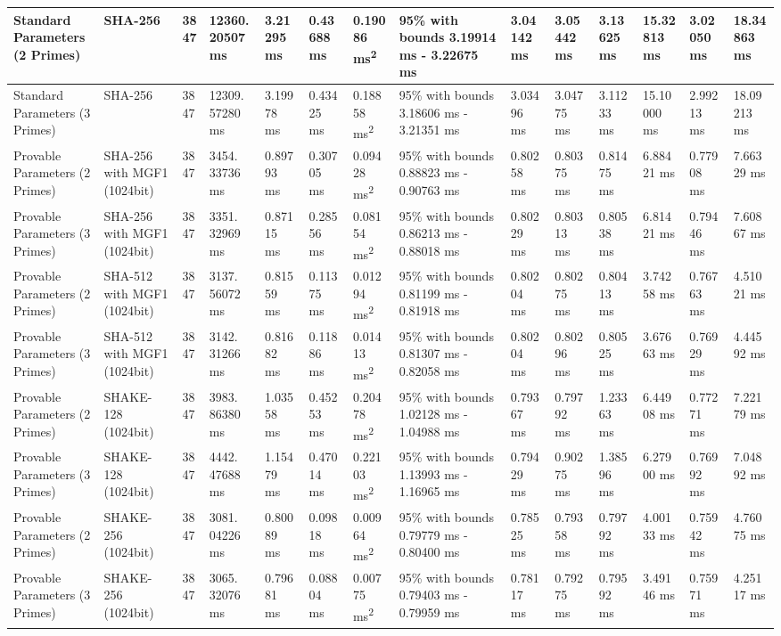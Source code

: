 \documentclass[]{final_report}
\theoremstyle{definition}
\begin{document}
\begin{landscape}
\begin{longtable}{|p{2.3cm}|p{1.8cm}|p{1.0cm}|p{1.7cm}|p{1.4cm}|p{1.5cm}|p{1.8cm}|p{1.5cm}|p{1.43cm}|p{1.5cm}|p{1.3cm}|p{1.4cm}|p{1.3cm}|p{1.3cm}|}
\hline
\endlastfoot
Standard Parameters (2 Primes) & SHA-256 & 3847 & 12360.
20507 ms & 3.21295 ms & 0.43688 ms & 0.19086 ms\textsuperscript{2} & 95\% with bounds 3.19914 ms - 3.22675 ms & 3.04142 ms & 3.05442 ms & 3.13625 ms & 15.32813 ms & 3.02050 ms & 18.34863 ms \\
\hline
Standard Parameters (3 Primes) & SHA-256 & 3847 & 12309.
57280 ms & 3.19978 ms & 0.43425 ms & 0.18858 ms\textsuperscript{2} & 95\% with bounds 3.18606 ms - 3.21351 ms & 3.03496 ms & 3.04775 ms & 3.11233 ms & 15.10000 ms & 2.99213 ms & 18.09213 ms \\
\hline
Provable Parameters (2 Primes) & SHA-256 with MGF1 (1024bit) & 3847 & 3454.
33736 ms & 0.89793 ms & 0.30705 ms & 0.09428 ms\textsuperscript{2} & 95\% with bounds 0.88823 ms - 0.90763 ms & 0.80258 ms & 0.80375 ms & 0.81475 ms & 6.88421 ms & 0.77908 ms & 7.66329 ms \\
\hline
Provable Parameters (3 Primes) & SHA-256 with MGF1 (1024bit) & 3847 & 3351.
32969 ms & 0.87115 ms & 0.28556 ms & 0.08154 ms\textsuperscript{2} & 95\% with bounds 0.86213 ms - 0.88018 ms & 0.80229 ms & 0.80313 ms & 0.80538 ms & 6.81421 ms & 0.79446 ms & 7.60867 ms \\
\hline
Provable Parameters (2 Primes) & SHA-512 with MGF1 (1024bit) & 3847 & 3137.
56072 ms & 0.81559 ms & 0.11375 ms & 0.01294 ms\textsuperscript{2} & 95\% with bounds 0.81199 ms - 0.81918 ms & 0.80204 ms & 0.80275 ms & 0.80413 ms & 3.74258 ms & 0.76763 ms & 4.51021 ms \\
\hline
Provable Parameters (3 Primes) & SHA-512 with MGF1 (1024bit) & 3847 & 3142.
31266 ms & 0.81682 ms & 0.11886 ms & 0.01413 ms\textsuperscript{2} & 95\% with bounds 0.81307 ms - 0.82058 ms & 0.80204 ms & 0.80296 ms & 0.80525 ms & 3.67663 ms & 0.76929 ms & 4.44592 ms \\
\hline
Provable Parameters (2 Primes) & SHAKE-128 (1024bit) & 3847 & 3983.
86380 ms & 1.03558 ms & 0.45253 ms & 0.20478 ms\textsuperscript{2} & 95\% with bounds 1.02128 ms - 1.04988 ms & 0.79367 ms & 0.79792 ms & 1.23363 ms & 6.44908 ms & 0.77271 ms & 7.22179 ms \\
\hline
Provable Parameters (3 Primes) & SHAKE-128 (1024bit) & 3847 & 4442.
47688 ms & 1.15479 ms & 0.47014 ms & 0.22103 ms\textsuperscript{2} & 95\% with bounds 1.13993 ms - 1.16965 ms & 0.79429 ms & 0.90275 ms & 1.38596 ms & 6.27900 ms & 0.76992 ms & 7.04892 ms \\
\hline
Provable Parameters (2 Primes) & SHAKE-256 (1024bit) & 3847 & 3081.
04226 ms & 0.80089 ms & 0.09818 ms & 0.00964 ms\textsuperscript{2} & 95\% with bounds 0.79779 ms - 0.80400 ms & 0.78525 ms & 0.79358 ms & 0.79792 ms & 4.00133 ms & 0.75942 ms & 4.76075 ms \\
\hline
Provable Parameters (3 Primes) & SHAKE-256 (1024bit) & 3847 & 3065.
32076 ms & 0.79681 ms & 0.08804 ms & 0.00775 ms\textsuperscript{2} & 95\% with bounds 0.79403 ms - 0.79959 ms & 0.78117 ms & 0.79275 ms & 0.79592 ms & 3.49146 ms & 0.75971 ms & 4.25117 ms \\
\hline




\end{longtable}
\end{landscape}
\end{document}
